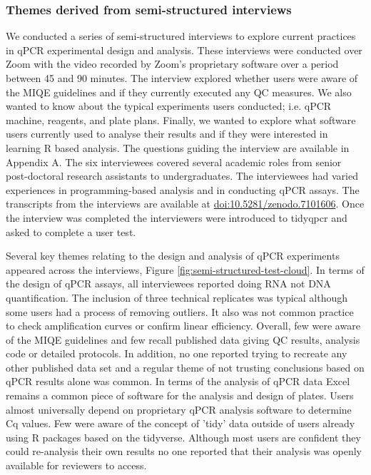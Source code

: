 \documentclass[../main.tex]{subfiles}
\begin{document}
\subsubsection{Themes derived from semi-structured interviews}

We conducted a series of semi-structured interviews to explore current practices in qPCR experimental design and analysis.
These interviews were conducted over Zoom with the video recorded by Zoom's proprietary software over a period between 45 and 90 minutes.
The interview explored whether users were aware of the MIQE guidelines and if they currently executed any QC measures. 
We also wanted to know about the typical experiments users conducted; i.e. qPCR machine, reagents, and plate plans. 
Finally, we wanted to explore what software users currently used to analyse their results and if they were interested in learning R based analysis. 
The questions guiding the interview are available in Appendix A.
The six interviewees covered several academic roles from senior post-doctoral research assistants to undergraduates.
The interviewees had varied experiences in programming-based analysis and in conducting qPCR assays.
The transcripts from the interviews are available at \href{https://doi.org/10.5281/zenodo.7101606}{doi:10.5281/zenodo.7101606}.
Once the interview was completed the interviewers were introduced to tidyqpcr and asked to complete a user test.

Several key themes relating to the design and analysis of qPCR experiments appeared across the interviews, Figure \ref{fig:semi-structured-test-cloud}.
In terms of the design of qPCR assays, all interviewees reported doing RNA not DNA quantification.
The inclusion of three technical replicates was typical although some users had a process of removing outliers.
It also was not common practice to check amplification curves or confirm linear efficiency.
Overall, few were aware of the MIQE guidelines and few recall published data giving QC results, analysis code or detailed protocols.
In addition, no one reported trying to recreate any other published data set and a regular theme of not trusting conclusions based on qPCR results alone was common.
In terms of the analysis of qPCR data Excel remains a common piece of software for the analysis and design of plates.
Users almost universally depend on proprietary qPCR analysis software to determine Cq values.
Few were aware of the concept of 'tidy' data outside of users already using R packages  based on the tidyverse.
Although most users are confident they could re-analysis their own results no one reported that their analysis was openly available for reviewers to access.
\end{document}
